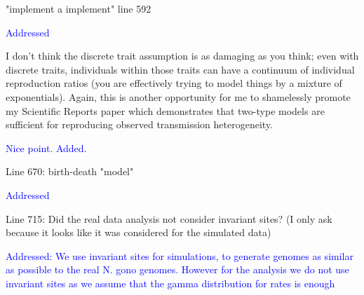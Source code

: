 \documentclass[pdflatex,sn-nature]{sn-jnl}%
\begin{document}
"implement a implement" line 592

\textcolor{blue}{Addressed}

I don't think the discrete trait assumption is as damaging as you think; even with discrete traits, individuals within those traits can have a continuum of individual reproduction ratios (you are effectively trying to model things by a mixture of exponentials). Again, this is another opportunity for me to shamelessly promote my Scientific Reports paper which demonstrates that two-type models are sufficient for reproducing observed transmission heterogeneity.

\textcolor{blue}{Nice point. Added.}

Line 670: birth-death "model"

\textcolor{blue}{Addressed}

Line 715: Did the real data analysis not consider invariant sites? (I only ask because it looks like it was considered for the simulated data)

\textcolor{blue}{Addressed: We use invariant sites for simulations, to generate genomes as similar as possible to the real N. gono genomes. However for the analysis we do not use invariant sites as we assume that the gamma distribution for rates is enough}
\end{document}
